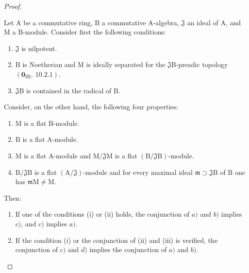 \begin{proof}
\begin{lemma}[11.3.10.2]
\label{IV.11.3.10.2}
Let $\mathrm{A}$ be a commutative ring, $\mathrm{B}$ a commutative $\mathrm{A}$-algebra, $\mathfrak{J}$ an ideal of $\mathrm{A}$, and $\mathrm{M}$ a $\mathrm{B}$-module. Consider first the following conditions:
\begin{enumerate}[label=\emph{(\roman*)}]
  \item $\mathfrak{J}$ is nilpotent.
  \item $\mathrm{B}$ is Noetherian and $\mathrm{M}$ is ideally separated for the $\mathfrak{J}\mathrm{B}$-preadic topology $(\mathbf{0}_{\mathrm{III}},~10.2.1)$.
  \item $\mathfrak{J}\mathrm{B}$ is contained in the radical of $\mathrm{B}$.
\end{enumerate}
Consider, on the other hand, the following four properties:
\begin{enumerate}[label=\emph{\alph*)}]
  \item $\mathrm{M}$ is a flat $\mathrm{B}$-module.
  \item $\mathrm{B}$ is a flat $\mathrm{A}$-module.
  \item $\mathrm{M}$ is a flat $\mathrm{A}$-module and $\mathrm{M}/\mathfrak{J}\mathrm{M}$ is a flat $(\mathrm{B}/\mathfrak{J}\mathrm{B})$-module.
  \item $\mathrm{B}/\mathfrak{J}\mathrm{B}$ is a flat $(\mathrm{A}/\mathfrak{J})$-module and for every maximal ideal $\mathfrak{m}\supset\mathfrak{J}\mathrm{B}$ of $\mathrm{B}$ one has $\mathfrak{m}\mathrm{M}\neq\mathrm{M}$.
\end{enumerate}
Then:
\begin{enumerate}[label=\arabic{enumi}\textsuperscript{o}]
  \item If one of the conditions (i) or (ii) holds, the conjunction of $a)$ and $b)$ implies $c)$, and $c)$ implies $a)$.
  \item {} If the condition (i) or the conjunction of (ii) and (iii) is verified, the conjunction of $c)$ and $d)$ implies the conjunction of $a)$ and $b)$.
\end{enumerate}
\end{lemma}


\end{proof}
